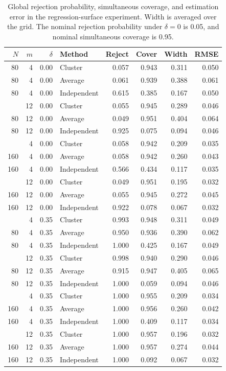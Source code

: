 \begin{table}[htbp]
\centering
\caption{Global rejection probability, simultaneous coverage, and estimation error in the regression-surface experiment. Width is averaged over the grid. The nominal rejection probability under $\delta=0$ is 0.05, and nominal simultaneous coverage is 0.95.}\label{tab:surface}
\small
\begin{tabular}{rrrlrrrr}
\toprule
$N$ & $m$ & $\delta$ & Method & Reject & Cover & Width & RMSE \\
\midrule
80 & 4 & 0.00 & Cluster & 0.057 & 0.943 & 0.311 & 0.050 \\
80 & 4 & 0.00 & Average & 0.061 & 0.939 & 0.388 & 0.061 \\
80 & 4 & 0.00 & Independent & 0.615 & 0.385 & 0.167 & 0.050 \\
\addlinespace[2pt]
80 & 12 & 0.00 & Cluster & 0.055 & 0.945 & 0.289 & 0.046 \\
80 & 12 & 0.00 & Average & 0.049 & 0.951 & 0.404 & 0.064 \\
80 & 12 & 0.00 & Independent & 0.925 & 0.075 & 0.094 & 0.046 \\
\addlinespace[2pt]
160 & 4 & 0.00 & Cluster & 0.058 & 0.942 & 0.209 & 0.035 \\
160 & 4 & 0.00 & Average & 0.058 & 0.942 & 0.260 & 0.043 \\
160 & 4 & 0.00 & Independent & 0.566 & 0.434 & 0.117 & 0.035 \\
\addlinespace[2pt]
160 & 12 & 0.00 & Cluster & 0.049 & 0.951 & 0.195 & 0.032 \\
160 & 12 & 0.00 & Average & 0.055 & 0.945 & 0.272 & 0.045 \\
160 & 12 & 0.00 & Independent & 0.922 & 0.078 & 0.067 & 0.032 \\
\addlinespace[2pt]
80 & 4 & 0.35 & Cluster & 0.993 & 0.948 & 0.311 & 0.049 \\
80 & 4 & 0.35 & Average & 0.950 & 0.936 & 0.390 & 0.062 \\
80 & 4 & 0.35 & Independent & 1.000 & 0.425 & 0.167 & 0.049 \\
\addlinespace[2pt]
80 & 12 & 0.35 & Cluster & 0.998 & 0.940 & 0.290 & 0.046 \\
80 & 12 & 0.35 & Average & 0.915 & 0.947 & 0.405 & 0.065 \\
80 & 12 & 0.35 & Independent & 1.000 & 0.059 & 0.094 & 0.046 \\
\addlinespace[2pt]
160 & 4 & 0.35 & Cluster & 1.000 & 0.955 & 0.209 & 0.034 \\
160 & 4 & 0.35 & Average & 1.000 & 0.956 & 0.260 & 0.042 \\
160 & 4 & 0.35 & Independent & 1.000 & 0.409 & 0.117 & 0.034 \\
\addlinespace[2pt]
160 & 12 & 0.35 & Cluster & 1.000 & 0.957 & 0.196 & 0.032 \\
160 & 12 & 0.35 & Average & 1.000 & 0.957 & 0.274 & 0.044 \\
160 & 12 & 0.35 & Independent & 1.000 & 0.092 & 0.067 & 0.032 \\
\bottomrule
\end{tabular}
\end{table}
